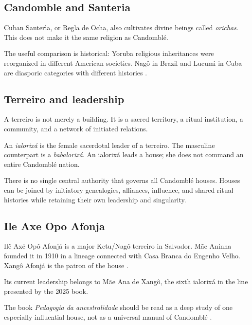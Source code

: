 \subsection{Candomble and Santeria}
\label{religion-section-candomble-santeria}

Cuban Santer\'\i a, or Regla de Ocha, also
cultivates divine beings called
\emph{orichas}.  This does not make it the
same religion as Candombl\'e.

The useful comparison is historical:
Yoruba religious inheritances were
reorganized in different American
societies.  Nag\^o in Brazil and Lucum\'\i
in Cuba are diasporic categories with
different histories
\cite{lovejoyojo2015lucumi}.

\subsection{Terreiro and leadership}
\label{religion-section-terreiro-leadership}

A terreiro is not merely a building.  It is
a sacred territory, a ritual institution,
a community, and a network of initiated
relations.

An \emph{ialorix\'a} is the female
sacerdotal leader of a terreiro.  The
masculine counterpart is a
\emph{babalorix\'a}.  An ialorix\'a leads a
house; she does not command an entire
Candombl\'e nation.

There is no single central authority that
governs all Candombl\'e houses.  Houses can
be joined by initiatory genealogies,
alliances, influence, and shared ritual
histories while retaining their own
leadership and singularity.

\subsection{Ile Axe Opo Afonja}
\label{religion-section-opo-afonja}

Il\^e Ax\'e Op\^o Afonj\'a is a major
Ketu/Nag\^o terreiro in Salvador.  M\~ae
Aninha founded it in 1910 in a lineage
connected with Casa Branca do Engenho
Velho.  Xang\^o Afonj\'a is the patron of
the house \cite{barata2025ancestralidade}.

Its current leadership belongs to M\~ae Ana
de Xang\^o, the sixth ialorix\'a in the
line presented by the 2025 book.

The book
\emph{Pedagogia da ancestralidade}
should be read as a deep study of one
especially influential house, not as a
universal manual of Candombl\'e
\cite{barata2025ancestralidade}.

